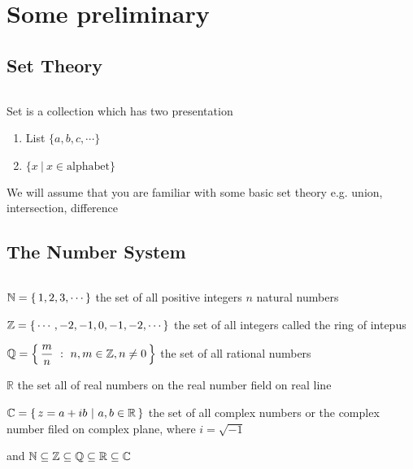

\section{Some preliminary}

\subsection{Set Theory}$ $

Set is a collection which has two presentation

\begin{enumerate}
	\item List $\{a,b,c,\cdots\}$
	\item $\{x ~|~x \in \text{alphabet}\}$
\end{enumerate}

We will assume that you are familiar with some basic set theory e.g. union, intersection, difference

\subsection{The Number System} $ $ 

$\mathbb{N}=\left\{ \,1,2,3,\cdots \,\right\}$ the set of all positive integers $n$ natural numbers

$\mathbb{Z}=\left\{ \,\cdots,-2,-1,0,-1,-2,\cdots \,\right\}$ the set of all integers called the ring of intepus

$\mathbb{Q} = \left\{ \,\dfrac{m}{n}~:~n,m \in \mathbb{Z},n\neq 0 \,\right\}$ the set of all rational numbers %

$\mathbb{R}$ the set all of real numbers on the real number field on real line

$\mathbb{C} = \left\{ \,z=a+ib~|~a,b\in\mathbb{R} \,\right\}$ the set of all complex numbers or the complex number filed on complex plane, where $i = \sqrt{-1}$

and $\mathbb{N} \subseteq \mathbb{Z} \subseteq \mathbb{Q} \subseteq \mathbb{R} \subseteq \mathbb{C}$

\newpage

